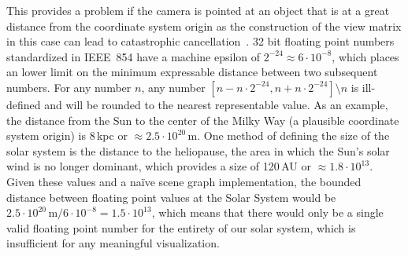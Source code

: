 This provides a problem if the camera is pointed at an object that is at a great distance from the coordinate system origin as the construction of the view matrix in this case can lead to catastrophic cancellation~\cite{cuyt2001remarkable}.  32 bit floating point numbers standardized in IEEE~854 have a machine epsilon of $2^{-24} \approx 6 \cdot 10^{-8}$, which places an lower limit on the minimum expressable distance between two subsequent numbers.  For any number $n$, any number $\left[ n - n \cdot 2^{-24}, n + n \cdot 2^{-24}\right] \setminus{n}$ is ill-defined and will be rounded to the nearest representable value.  As an example, the distance from the Sun to the center of the Milky Way (a plausible coordinate system origin) is 8\,kpc or $\approx 2.5 \cdot 10^{20}\,$m.  One method of defining the size of the solar system is the distance to the heliopause, the area in which the Sun's solar wind is no longer dominant, which provides a size of 120\,AU or $\approx 1.8 \cdot 10^{13}$.  Given these values and a na\"ive scene graph implementation, the bounded distance between floating point values at the Solar System would be $2.5 \cdot 10^{20}\,\textrm{m} / 6 \cdot 10^{-8} = 1.5 \cdot 10^{13}$, which means that there would only be a single valid floating point number for the entirety of our solar system, which is insufficient for any meaningful visualization.

